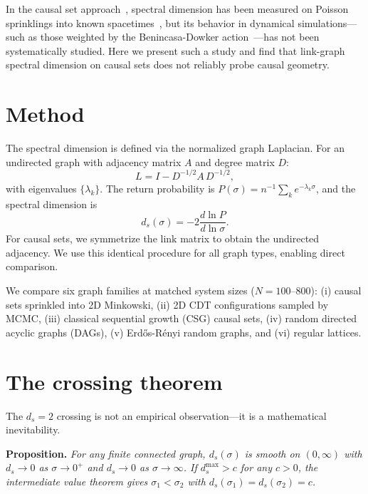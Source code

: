 \documentclass[aps,prd,twocolumn,superscriptaddress,nofootinbib]{revtex4-2}
\begin{document}
In the causal set approach~\cite{bombelli1987,surya2019}, spectral dimension has been measured on Poisson sprinklings into known spacetimes~\cite{eichhorn2014}, but its behavior in dynamical simulations---such as those weighted by the Benincasa-Dowker action~\cite{benincasa2010,surya2012,glaser2018}---has not been systematically studied. Here we present such a study and find that link-graph spectral dimension on causal sets does not reliably probe causal geometry.

\section{Method}

The spectral dimension is defined via the normalized graph Laplacian. For an undirected graph with adjacency matrix $A$ and degree matrix $D$:
\begin{equation}
L = I - D^{-1/2} A \, D^{-1/2},
\end{equation}
with eigenvalues $\{\lambda_k\}$. The return probability is $P(\sigma) = n^{-1} \sum_k e^{-\lambda_k \sigma}$, and the spectral dimension is
\begin{equation}
d_s(\sigma) = -2 \frac{d \ln P}{d \ln \sigma}.
\end{equation}
For causal sets, we symmetrize the link matrix to obtain the undirected adjacency. We use this identical procedure for all graph types, enabling direct comparison.

We compare six graph families at matched system sizes ($N = 100$--$800$): (i) causal sets sprinkled into 2D Minkowski, (ii) 2D CDT configurations sampled by MCMC, (iii) classical sequential growth (CSG) causal sets, (iv) random directed acyclic graphs (DAGs), (v) Erd\H{o}s-R\'enyi random graphs, and (vi) regular lattices.

\section{The crossing theorem}

The $d_s = 2$ crossing is not an empirical observation---it is a mathematical inevitability.

\textbf{Proposition.} \emph{For any finite connected graph, $d_s(\sigma)$ is smooth on $(0,\infty)$ with $d_s \to 0$ as $\sigma \to 0^+$ and $d_s \to 0$ as $\sigma \to \infty$. If $d_s^{\max} > c$ for any $c > 0$, the intermediate value theorem gives $\sigma_1 < \sigma_2$ with $d_s(\sigma_1) = d_s(\sigma_2) = c$.}
\end{document}
